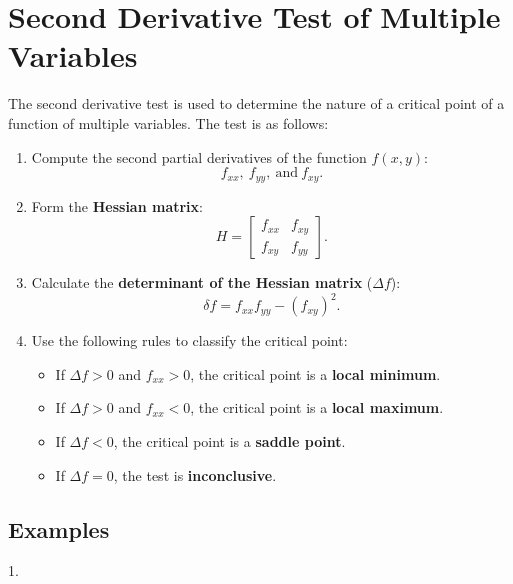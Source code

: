 \section{Second Derivative Test of Multiple Variables}

The second derivative test is used to determine the nature of a critical point of a function of multiple variables. The test is as follows:

\begin{enumerate}
    \item Compute the second partial derivatives of the function \(f(x, y)\): 
    \[
    f_{xx}, \ f_{yy}, \ \text{and} \ f_{xy}.
    \]

    \item Form the \textbf{Hessian matrix}:
    \[
    H = \begin{bmatrix}
    f_{xx} & f_{xy} \\
    f_{xy} & f_{yy}
    \end{bmatrix}.
    \]

    \item Calculate the \textbf{determinant of the Hessian matrix} (\(\Delta f\)):
    \[
    \delta f = f_{xx}f_{yy} - (f_{xy})^2.
    \]

    \item Use the following rules to classify the critical point:
    \begin{itemize}
        \item If \(\Delta f > 0\) and \(f_{xx} > 0\), the critical point is a \textbf{local minimum}.
        \item If \(\Delta f > 0\) and \(f_{xx} < 0\), the critical point is a \textbf{local maximum}.
        \item If \(\Delta f < 0\), the critical point is a \textbf{saddle point}.
        \item If \(\Delta f = 0\), the test is \textbf{inconclusive}.
    \end{itemize}
\end{enumerate}




\subsection{Examples}
1. 
 
